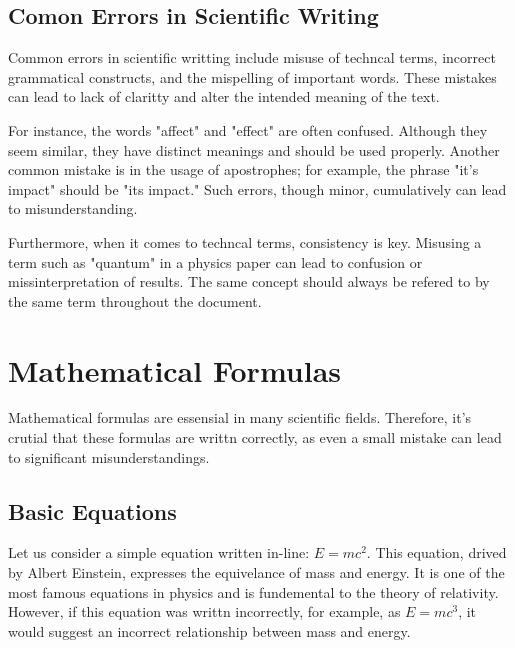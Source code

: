 \documentclass[12pt]{artcle} %
\begin{document}
\subsection{Comon Errors in Scientific Writing} %
Common errors in scientific writting include misuse of techncal terms, incorrect grammatical constructs, and the mispelling of important words. %
These mistakes can lead to lack of claritty and alter the intended meaning of the text. %

For instance, the words "affect" and "effect" are often confused. %
Although they seem similar, they have distinct meanings and should be used properly. %
Another common mistake is in the usage of apostrophes; for example, the phrase "it's impact" should be "its impact." %
Such errors, though minor, cumulatively can lead to misunderstanding. %

Furthermore, when it comes to techncal terms, consistency is key. %
Misusing a term such as "quantum" in a physics paper can lead to confusion or missinterpretation of results. %
The same concept should always be refered to by the same term throughout the document. %

\section{Mathematical Formulas} %
Mathematical formulas are essensial in many scientific fields. %
Therefore, it's crutial that these formulas are writtn correctly, as even a small mistake can lead to significant misunderstandings. %

\subsection{Basic Equations} %
Let us consider a simple equation written in-line: $E = mc^2$. %
This equation, drived by Albert Einstein, expresses the equivelance of mass and energy. %
It is one of the most famous equations in physics and is fundemental to the theory of relativity. %
However, if this equation was writtn incorrectly, for example, as $E = mc^3$, it would suggest an incorrect relationship between mass and energy. %
\end{document}
